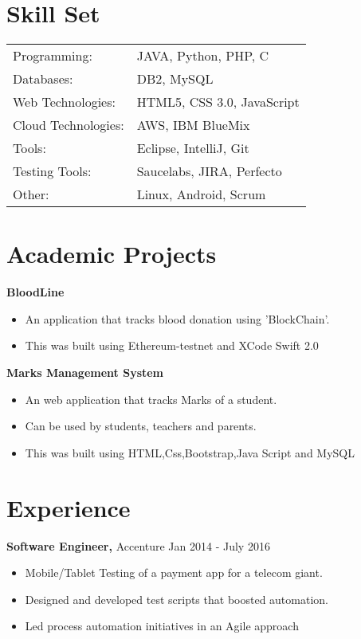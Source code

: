 \documentclass[margin]{res}
\begin{document}
\begin{resume}
{\section{Skill Set}
   \begin{tabular}{l p{3in}}
    {Programming:} & JAVA, Python, PHP, C \\
    {Databases:} &  DB2, MySQL \\
    {Web Technologies:} &  HTML5, CSS 3.0, JavaScript \\
    {Cloud Technologies:} &  AWS, IBM BlueMix \\
    {Tools:} & Eclipse, IntelliJ, Git \\
    {Testing Tools:} & Saucelabs, JIRA, Perfecto \\
    {Other:} & Linux, Android, Scrum \\
     \end{tabular}
     
\section{Academic Projects}
 {\bf BloodLine }
 \begin{itemize} \itemsep -2pt  %
 \item An application that tracks blood donation using 'BlockChain'.
 \item This was built using Ethereum-testnet and XCode Swift 2.0
 \end{itemize}
 {\bf Marks Management System }
 \begin{itemize} \itemsep -2pt  %
 \item An web application that tracks Marks of a student.
 \item Can be used by students, teachers and parents.
 \item This was built using HTML,Css,Bootstrap,Java Script and MySQL
 \end{itemize}
  

\section{Experience}
 {\bf Software Engineer,} Accenture \hfill Jan  2014  - July 2016
 \begin{itemize} \itemsep -2pt  %
 \item Mobile/Tablet Testing of a payment app for a telecom giant. 
 \item Designed and developed test scripts that boosted automation.
 \item Led process automation initiatives in an Agile approach 
 \end{itemize}

}
\end{resume}
\end{document}
